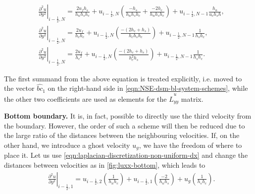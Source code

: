 \documentclass{article}
\begin{document}
\begin{equation}
\begin{aligned}
& \left.\frac{\partial ^2 u}{\partial y^2}\right|_{i-\frac{1}{2},N}=\frac{2 u_f h_s}{h_n h_s h_c}+u_{i-\frac{1}{2},N}\left(\frac{-h_s}{h_n h_s h_c}+\frac{-2 h_c}{h_n h_s h_c}\right)+u_{i-\frac{1}{2},N-1} \frac{h_n}{u_c h_s h},\\
& \left.\frac{\partial^2 u}{\partial y^2}\right|_{i-\frac{1}{2},N}=\frac{2 u_f}{h_c h_c}+u_{i-\frac{1}{2},N}\left(\frac{-\left(2 h_c+h_s\right)}{h_c h_s h_c}\right)+u_{i-\frac{1}{2},N-1} \frac{1}{h_s h_c}, \\
& \left.\frac{\partial^2 u}{\partial y^2}\right|_{i-\frac{1}{2},N}=\frac{2 u_f}{h_c{ }^2}+u_{i-\frac{1}{2},N}\left(\frac{-\left(2 h_c+h_s\right)}{h_c^2 h_s}\right)+u_{i-\frac{1}{2},N-1} \frac{1}{h_s h_c}.
\end{aligned}
\end{equation}

The first summand from the above equation is treated explicitly, i.e. moved to the vector $\hat{bc}_1$ on the right-hand side in \cref{eqn:NSE-dsm-bl-system-schemes}, while the other two coefficients are used as elements for the $\hat{L}^u_{yy}$ matrix.

\textbf{Bottom boundary.}
It is, in fact, possible to directly use the third velocity from the boundary. However, the order of such a scheme will then be reduced due to the large ratio of the distances between the neighbouring velocities. If, on the other hand, we introduce a ghost velocity $u_g$, we have the freedom of where to place it. Let us use \cref{eqn:laplacian-discretization-non-uniform-dx} and change the distances between velocities as in \cref{fig:luxx-bottom}, which leads to
\begin{equation}
\begin{aligned}
&\left.\frac{\partial^ 2 u}{\partial y^2}\right|_{i-\frac{1}{2},1}=u_{i-\frac{1}{2},2}\left(\frac{1}{h_n h_c}\right)+u_{i-\frac{1}{2},1}\left(\frac{-2}{h_n h_s}\right)+u_g\left(\frac{1}{h_s h_c}\right).\\
\end{aligned}
\end{equation}
\end{document}

